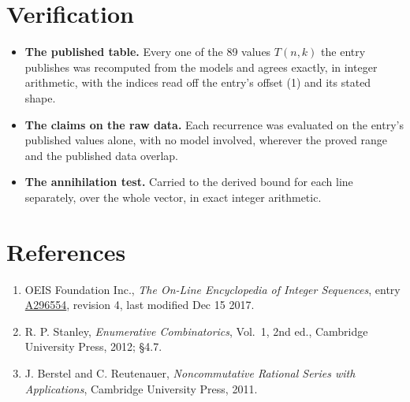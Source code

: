 \documentclass[11pt]{article}
\theoremstyle{definition}
\begin{document}
\section{Verification}

\begin{itemize}

\item {\bfseries The published table.} Every one of the 89 values $T(n,k)$ the entry publishes was recomputed from the models and agrees exactly, in integer arithmetic, with the indices read off the entry's offset (1) and its stated shape.

\item {\bfseries The claims on the raw data.} Each recurrence was evaluated on the entry's published values alone, with no model involved, wherever the proved range and the published data overlap.

\item {\bfseries The annihilation test.} Carried to the derived bound for each line separately, over the whole vector, in exact integer arithmetic.

\end{itemize}

\section{References}

\begin{enumerate}

\item OEIS Foundation Inc., \emph{The On-Line Encyclopedia of Integer Sequences}, entry \href{https://oeis.org/A296554}{A296554}, revision 4, last modified Dec 15 2017.

\item R. P. Stanley, \emph{Enumerative Combinatorics}, Vol.~1, 2nd ed., Cambridge University Press, 2012; \S4.7.

\item J. Berstel and C. Reutenauer, \emph{Noncommutative Rational Series with Applications}, Cambridge University Press, 2011.

\end{enumerate}
\end{document}
